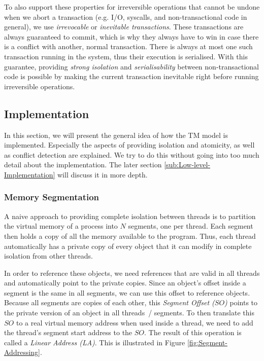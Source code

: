 \documentclass{sigplanconf}
\begin{document}
To also support these properties for irreversible operations that
cannot be undone when we abort a transaction (e.g. I/O, syscalls, and
non-transactional code in general), we use \emph{irrevocable} or
\emph{inevitable transactions}. These transactions are always
guaranteed to commit, which is why they always have to win in case
there is a conflict with another, normal transaction. There is always
at most one such transaction running in the system, thus their
execution is serialised. With this guarantee, providing \emph{strong
isolation} and \emph{serialisability} between non-transactional code
is possible by making the current transaction inevitable right before
running irreversible operations.


\subsection{Implementation}

In this section, we will present the general idea of how the TM model
is implemented. Especially the aspects of providing isolation and
atomicity, as well as conflict detection are explained. We try to do
this without going into too much detail about the implementation.  The
later section \ref{sub:Low-level-Implementation} will discuss it in
more depth.


\subsubsection{Memory Segmentation}

A naive approach to providing complete isolation between threads is to
partition the virtual memory of a process into $N$ segments, one per
thread. Each segment then holds a copy of all the memory available to
the program. Thus, each thread automatically has a private copy of
every object that it can modify in complete isolation from other
threads.

In order to reference these objects, we need references that are valid
in all threads and automatically point to the private copies. Since
an object's offset inside a segment is the same in all segments, we
can use this offset to reference objects. Because all segments are
copies of each other, this \emph{Segment Offset ($SO$)} points to the
private version of an object in all threads~/ segments. To then
translate this $SO$ to a real virtual memory address when used inside a
thread, we need to add the thread's segment start address to the
$SO$. The result of this operation is called a \emph{Linear Address
  (LA)}. This is illustrated in Figure \ref{fig:Segment-Addressing}.
\end{document}

